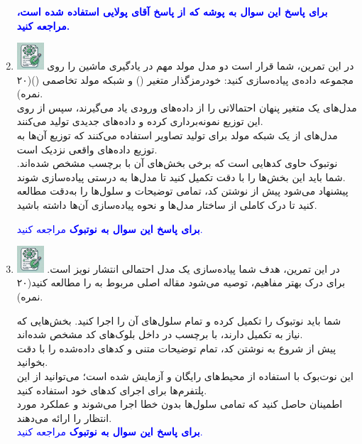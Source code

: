 \documentclass[12pt]{article}
\begin{document}
\begin{enumerate}
\begin{enumerate}
    \end{enumerate}

    \textcolor{blue}{
    \textbf{برای پاسخ این سوال به پوشه  که از پاسخ آقای پولایی استفاده شده است، مراجعه کنید.}}
    
    \item \includegraphics[width=1cm]{figs/Allowed_with_contributino.jpg}
     در این تمرین، شما قرار است دو مدل مولد مهم در یادگیری ماشین را روی مجموعه داده‌ی  پیاده‌سازی کنید: خودرمزگذار متغیر () و شبکه مولد تخاصمی ()(۲۰ نمره).\\
    مدل‌های  یک متغیر پنهان احتمالاتی را از داده‌های ورودی یاد می‌گیرند، سپس از روی این توزیع نمونه‌برداری کرده و داده‌های جدیدی تولید می‌کنند.\\
    مدل‌های  از یک شبکه مولد برای تولید تصاویر استفاده می‌کنند که توزیع آن‌ها به توزیع داده‌های واقعی نزدیک است.\\
   نوتبوک  حاوی کدهایی است که برخی بخش‌های آن با برچسب  مشخص شده‌اند. شما باید این بخش‌ها را با دقت تکمیل کنید تا مدل‌ها به درستی پیاده‌سازی شوند.\\
    پیشنهاد می‌شود پیش از نوشتن کد، تمامی توضیحات و سلول‌ها را به‌دقت مطالعه کنید تا درک کاملی از ساختار مدل‌ها و نحوه پیاده‌سازی آن‌ها داشته باشید.

    \textcolor{blue}{
    \textbf{برای پاسخ این سوال به نوتبوک } مراجعه کنید.
    }

     \item \includegraphics[width=1cm]{figs/Allowed_with_contributino.jpg}
     در این تمرین، هدف شما پیاده‌سازی یک مدل احتمالی انتشار نویز است. برای درک بهتر مفاهیم، توصیه می‌شود مقاله اصلی مربوط به \href{https://arxiv.org/pdf/2006.11239}{} را مطالعه کنید(۲۰ نمره).

    شما باید نوتبوک  را تکمیل کرده و تمام سلول‌های آن را اجرا کنید. بخش‌هایی که نیاز به تکمیل دارند، با برچسب  در داخل بلوک‌های کد مشخص شده‌اند.\\
    پیش از شروع به نوشتن کد، تمام توضیحات متنی و کدهای داده‌شده را با دقت بخوانید.\\
    این نوت‌بوک با استفاده از محیط‌های رایگان  و  آزمایش شده است؛ می‌توانید از این پلتفرم‌ها برای اجرای کدهای خود استفاده کنید.\\
    اطمینان حاصل کنید که تمامی سلول‌ها بدون خطا اجرا می‌شوند و عملکرد مورد انتظار را ارائه می‌دهند.\\

    \textcolor{blue}{
    \textbf{برای پاسخ این سوال به نوتبوک } مراجعه کنید.
    }

\end{enumerate}
\end{document}
